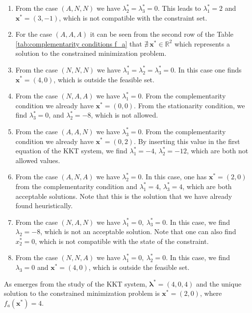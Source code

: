 \documentclass[a4paper,11pt]{article}
\begin{document}
\begin{enumerate}
	\item From the case $(A,N,N)$ we have $ \lambda_{2}^*=\lambda_{3}^*=0$. This leads to $\lambda_{1}^*=2$ and $\textbf{x}^*=(3,-1)$, which is not compatible with the constraint set.
	\item For the case $(A,A,A)$ it can be seen from the second row of the Table \ref{tab:complementarity conditions f_a} that $\nexists \ \textbf{x}^* \in \mathbb{R}^{2}$ which represents a solution to the constrained minimization problem.
	\item From the case $(N,N,N)$ we have $\lambda_{1}^*= \lambda_{2}^*= \lambda_{3}^*=0$. In this case one finds $\textbf{x}^* = (4,0)$, which is outside the feasible set.
	\item From the case $(N,A,A)$ we have $\lambda_{1}^*=0$. From the complementarity condition we already have $\textbf{x}^*=(0,0)$. From the stationarity condition, we find $\lambda_{3}^*=0$, and $\lambda_{2}^*=-8$, which is not allowed.
	\item From the case $(A,A,N)$ we have $\lambda_{3}^*=0$. From the complementarity condition we already have $\textbf{x}^*=(0,2)$. By inserting this value in the first equation of the KKT system, we find $\lambda_{1}^*=-4$, $ \lambda_{2}^*=-12$, which are both not allowed values.
	\item From the case $(A,N,A)$ we have $\lambda_{2}^*=0$. In this case, one has $\textbf{x}^*=(2,0)$ from the complementarity condition and $\lambda_{1}^*=4$, $\lambda_{3}^*=4$, which are both acceptable solutions. Note that this is the solution that we have already found heuristically.
	\item From the case $(N, A, N)$ we have $\lambda_{1}^*=0,\ \lambda_{3}^*=0$. In this case, we find $\lambda_{2}=-8$, which is not an acceptable solution. Note that one can also find $x_{2}^*=0$, which is not compatible with the state of the constraint.
	\item From the case $(N, N, A)$ we have $\lambda_{1}^*=0,\ \lambda_{2}^*=0$. In this case, we find $\lambda_{3}=0$ and $\textbf{x}^*=(4,0)$, which is outside the feasible set.
\end{enumerate}

\noindent As emerges from the study of the KKT system, $\boldsymbol{\lambda}^*=(4,0,4)$ and the unique solution to the constrained minimization problem is $\textbf{x}^*=(2,0)$, where $f_{a}(\textbf{x}^*) = 4$.
\end{document}
